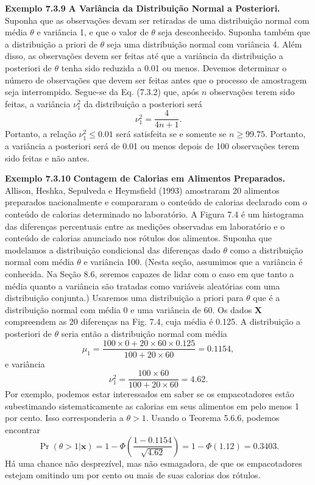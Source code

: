 \vspace{1cm}
\noindent\textbf{Exemplo 7.3.9} \quad \textbf{A Variância da Distribuição Normal a Posteriori.} Suponha que as observações devam ser retiradas de uma distribuição normal com média $\theta$ e variância 1, e que o valor de $\theta$ seja desconhecido. Suponha também que a distribuição a priori de $\theta$ seja uma distribuição normal com variância 4. Além disso, as observações devem ser feitas até que a variância da distribuição a posteriori de $\theta$ tenha sido reduzida a 0.01 ou menos. Devemos determinar o número de observações que devem ser feitas antes que o processo de amostragem seja interrompido.
Segue-se da Eq. (7.3.2) que, após $n$ observações terem sido feitas, a variância $\nu_1^2$ da distribuição a posteriori será
$$ \nu_1^2 = \frac{4}{4n+1}. $$
Portanto, a relação $\nu_1^2 \le 0.01$ será satisfeita se e somente se $n \ge 99.75$. Portanto, a variância a posteriori será de 0.01 ou menos depois de 100 observações terem sido feitas e não antes.

\vspace{1cm}
\noindent\textbf{Exemplo 7.3.10} \quad \textbf{Contagem de Calorias em Alimentos Preparados.} Allison, Heshka, Sepulveda e Heymsfield (1993) amostraram 20 alimentos preparados nacionalmente e compararam o conteúdo de calorias declarado com o conteúdo de calorias determinado no laboratório. A Figura 7.4 é um histograma das diferenças percentuais entre as medições observadas em laboratório e o conteúdo de calorias anunciado nos rótulos dos alimentos. Suponha que modelamos a distribuição condicional das diferenças dado $\theta$ como a distribuição normal com média $\theta$ e variância 100. (Nesta seção, assumimos que a variância é conhecida. Na Seção 8.6, seremos capazes de lidar com o caso em que tanto a média quanto a variância são tratadas como variáveis aleatórias com uma distribuição conjunta.) Usaremos uma distribuição a priori para $\theta$ que é a distribuição normal com média 0 e uma variância de 60. Os dados $\mathbf{X}$ compreendem as 20 diferenças na Fig. 7.4, cuja média é 0.125. A distribuição a posteriori de $\theta$ seria então a distribuição normal com média
$$ \mu_1 = \frac{100 \times 0 + 20 \times 60 \times 0.125}{100+20\times 60} = 0.1154, $$
e variância
$$ \nu_1^2 = \frac{100 \times 60}{100+20\times 60} = 4.62. $$
Por exemplo, podemos estar interessados em saber se os empacotadores estão subestimando sistematicamente as calorias em seus alimentos em pelo menos 1 por cento. Isso corresponderia a $\theta > 1$. Usando o Teorema 5.6.6, podemos encontrar
$$ \Pr(\theta > 1|\mathbf{x}) = 1 - \Phi\left(\frac{1-0.1154}{\sqrt{4.62}}\right) = 1-\Phi(1.12) = 0.3403. $$
Há uma chance não desprezível, mas não esmagadora, de que os empacotadores estejam omitindo um por cento ou mais de suas calorias dos rótulos.

